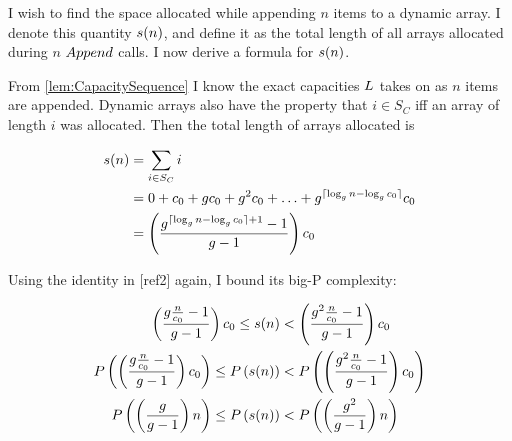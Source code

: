 \HdrSpaceComplex

I wish to find the space allocated while appending $n$ items to a dynamic array. I denote this quantity $s(n)$, and define it as the total length of all arrays allocated during $n$ $Append$ calls. I now derive a formula for $s(n)$.

From \ref{lem:CapacitySequence} I know the exact capacities $L$ takes on as $n$ items are appended. Dynamic arrays also have the property that $i \in S_C$ iff an array of length $i$ was allocated. Then the total length of arrays allocated is

\begin{align*}
s(n) &= \sum_{i \in S_C} i\\
&= 0 + c_0 + gc_0 + g^2c_0 + \ldots + g^{\lceil \log_{g} n - \log_{g} c_0 \rceil}c_0\\
&= \left( \frac{g^{\lceil \log_{g} n - \log_{g} c_0 \rceil + 1} - 1}{g - 1} \right) c_0
\end{align*}

Using the identity in [ref2] again, I bound its big-P complexity:

\begin{align*}
\left( \frac{g \frac{n}{c_0} - 1}{g - 1} \right) c_0 \leq s(n) &< \left( \frac{g^2 \frac{n}{c_0} - 1}{g - 1} \right) c_0\\
P\left( \left( \frac{g \frac{n}{c_0} - 1}{g - 1} \right) c_0 \right) \leq P\left( s(n) \right) &< P\left( \left( \frac{g^2 \frac{n}{c_0} - 1}{g - 1} \right) c_0 \right)\\
P\left( \left( \frac{g}{g - 1} \right) n \right) \leq P\left( s(n) \right) &< P\left( \left( \frac{g^2}{g - 1} \right) n \right)
\end{align*}